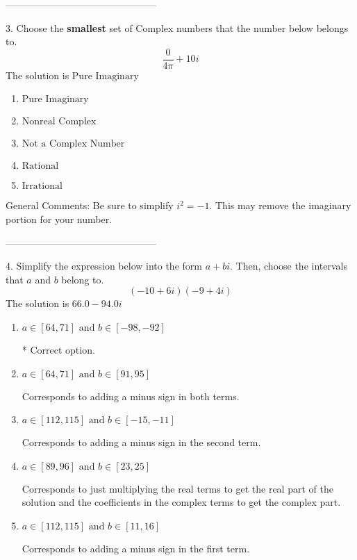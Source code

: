\documentclass{article}[10pt]
\begin{document}
-----------------------------------------------

3. Choose the \textbf{smallest} set of Complex numbers that the number below belongs to.
$$ \frac{0}{4 \pi}+10i $$ 
The solution is $ \text{Pure Imaginary} $ 

\begin{enumerate}[label=\Alph*.] 
\item $ \text{Pure Imaginary} $ 

  
\item $ \text{Nonreal Complex} $ 

  
\item $ \text{Not a Complex Number} $ 

  
\item $ \text{Rational} $ 

  
\item $ \text{Irrational} $ 

  
\end{enumerate} 
 
General Comments: Be sure to simplify $i^2 = -1$. This may remove the imaginary portion for your number.

-----------------------------------------------

4. Simplify the expression below into the form $a+bi$. Then, choose the intervals that $a$ and $b$ belong to.
$$ (-10 + 6 i)(-9 + 4 i) $$ 
The solution is $ 66.0 - 94.0 i $ 

\begin{enumerate}[label=\Alph*.] 
\item $ a \in [64, 71] \text{ and } b \in [-98, -92] $ 

 * Correct option. 
\item $ a \in [64, 71] \text{ and } b \in [91, 95] $ 

  Corresponds to adding a minus sign in both terms. 
\item $ a \in [112, 115] \text{ and } b \in [-15, -11] $ 

  Corresponds to adding a minus sign in the second term. 
\item $ a \in [89, 96] \text{ and } b \in [23, 25] $ 

  Corresponds to just multiplying the real terms to get the real part of the solution and the coefficients in the complex terms to get the complex part. 
\item $ a \in [112, 115] \text{ and } b \in [11, 16] $ 

  Corresponds to adding a minus sign in the first term. 
\end{enumerate} 
 
\end{document}
